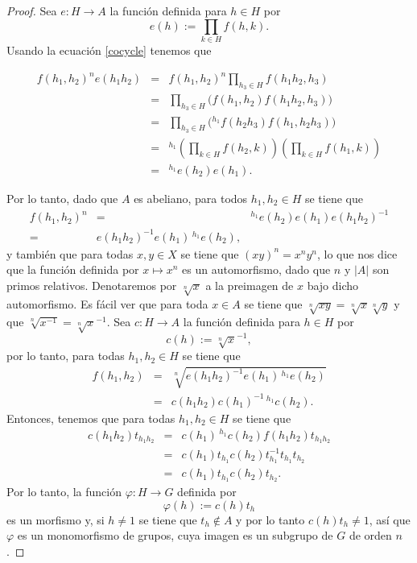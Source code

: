 \begin{proof}
    Sea $e:H\rightarrow A$ la funci\'on definida para $h\in H$ por 
    \[e(h) := \prod_{k\in H}f(h, k).\]
    Usando la ecuaci\'on \eqref{cocycle} tenemos que 
    
    \begin{eqnarray*}
	f(h_1, h_2)^ne(h_1h_2) & 	=&	f(h_1, h_2)^n\prod_{h_3\in H} f(h_1h_2, h_3)	                    \\
			&	=&	\prod_{h_3\in H} \big(f(h_1, h_2)f(h_1h_2, h_3)\big) 	                            \\
			&	=&	\prod_{h_3\in H} \big({}^{h_1}f(h_2h_3)f(h_1, h_2h_3)\big) 	                        \\
			&	=&	{}^{h_1}\left(\prod_{k\in H}f(h_2, k)\right)\left(\prod_{k\in H}f(h_1, k)\right)	\\
			&	=&	{}^{h_1}e(h_2)e(h_1).
    \end{eqnarray*}
    
    Por lo tanto, dado que $A$ es abeliano, para todos $h_1, h_2\in H$ se tiene que
    \begin{eqnarray*}
	f(h_1, h_2)^n &	 =&	 {}^{h_1}e(h_2)e(h_1)e(h_1h_2)^{-1} 	\\
			 =&	e(h_1h_2)^{-1}e(h_1){\,}^{h_1}e(h_2),
    \end{eqnarray*}
    y también que para todas $x,y\in X$ se tiene que $(xy)^n = x^ny^n$, lo que nos dice que la funci\'on 
    definida por $x\mapsto x^n$ es un automorfismo, dado que $n$ y $|A|$ son primos relativos. 
    Denotaremos por $\sqrt[n]{x}$ a la preimagen de $x$ bajo dicho automorfismo. 
    Es f\'acil ver que para toda $x\in A$ se tiene que $\sqrt[n]{xy} = \sqrt[n]{x}\sqrt[n]{y}$ y que 
    $\sqrt[n]{x^{-1}} = \sqrt[n]{x}^{-1}$. Sea $c:H\rightarrow A$ la funci\'on definida para $h\in H$ por
    \[c(h) := \sqrt[n]{x}^{-1},\]
    por lo tanto, para todas $h_1, h_2\in H$ se tiene que
    \begin{eqnarray*}
	f(h_1, h_2)&	 =&	 \sqrt[n]{e(h_1h_2)^{-1}e(h_1){\,}^{h_1}e(h_2)} 	\\
		   &	=&	c(h_1h_2)c(h_1)^{-1}{\,}^{h_1}c(h_2).
    \end{eqnarray*}
    Entonces, tenemos que para todas $h_1, h_2\in H$ se tiene que
    \begin{eqnarray*}
	c(h_1h_2)t_{h_1h_2} & 	=&	c(h_1){\,}^{h_1}c(h_2)f(h_1h_2)t_{h_1h_2}	\\
			    &	=&	c(h_1)t_{h_1}c(h_2)t^{-1}_{h_1}t_{h_1}t_{h_2}	    \\
			    &	=&	c(h_1)t_{h_1}c(h_2)t_{h_2}.
    \end{eqnarray*}
    Por lo tanto, la funci\'on $\varphi:H\rightarrow G$ definida por
    \[\varphi(h) := c(h)t_h\]
    es un morfismo y, si $h\neq 1$ se tiene que $t_h\not\in A$ y por lo tanto $c(h)t_h\neq 1$, 
    as\'i que $\varphi$ es un monomorfismo de grupos, cuya imagen es un subgrupo de $G$ de orden $n$.
\end{proof}